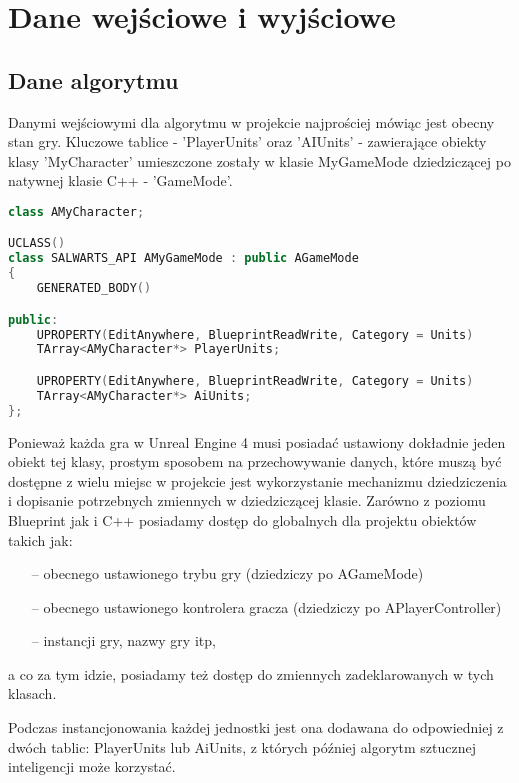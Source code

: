 \documentclass[12pt]{report}
\begin{document}
\section{Dane wejściowe i wyjściowe}
\subsection{Dane algorytmu}
Danymi wejściowymi dla algorytmu w projekcie najprościej mówiąc jest obecny stan gry. Kluczowe tablice - 'PlayerUnits' oraz 'AIUnits' - zawierające obiekty klasy 'MyCharacter' umieszczone zostały w klasie MyGameMode dziedziczącej po natywnej klasie C++ - 'GameMode'. 

\begin{lstlisting}[language=C++, backgroundcolor=\color{black!5}, basicstyle=\footnotesize, caption=Klasa AMyGameMode.h.]
   class AMyCharacter;

UCLASS()
class SALWARTS_API AMyGameMode : public AGameMode
{
	GENERATED_BODY()

public:
	UPROPERTY(EditAnywhere, BlueprintReadWrite, Category = Units)
	TArray<AMyCharacter*> PlayerUnits;

	UPROPERTY(EditAnywhere, BlueprintReadWrite, Category = Units)
	TArray<AMyCharacter*> AiUnits;
};
\end{lstlisting}



Ponieważ każda gra w Unreal Engine 4 musi posiadać ustawiony dokładnie jeden obiekt tej klasy, prostym sposobem na przechowywanie danych, które muszą być dostępne z wielu miejsc w projekcie jest wykorzystanie mechanizmu dziedziczenia i dopisanie potrzebnych zmiennych w dziedziczącej klasie. Zarówno z poziomu Blueprint jak i C++ posiadamy dostęp do globalnych dla projektu obiektów takich jak: 
\begin{itemize}
\item[--] obecnego ustawionego trybu gry (dziedziczy po AGameMode)
\item[--] obecnego ustawionego kontrolera gracza (dziedziczy po APlayerController)
\item[--] instancji gry, nazwy gry itp,
\end{itemize}
a co za tym idzie, posiadamy też dostęp do zmiennych zadeklarowanych w tych klasach. 

Podczas instancjonowania każdej jednostki jest ona dodawana do odpowiedniej z dwóch tablic: PlayerUnits lub AiUnits, z których później algorytm sztucznej inteligencji może korzystać.
\end{document}
